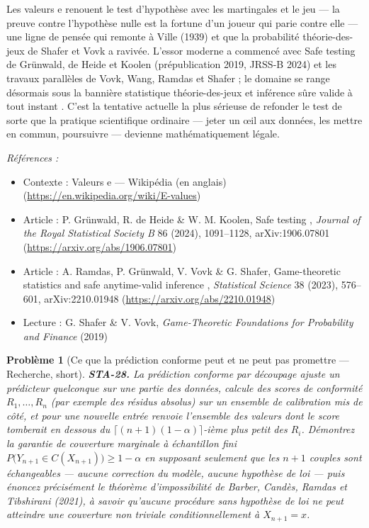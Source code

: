 \documentclass[11pt]{article}
\newtheorem{problem}{Problème}
\newenvironment{refs}{\par\small\noindent\emph{Références :}\begin{itemize}\setlength\itemsep{0pt}}{\end{itemize}\normalsize}
\begin{document}
\noindent Les valeurs e renouent le test d'hypothèse avec les martingales et le jeu --- la
preuve contre l'hypothèse nulle est la fortune d'un joueur qui parie contre elle --- une ligne de
pensée qui remonte à Ville (1939) et que la probabilité théorie-des-jeux de Shafer et Vovk a
ravivée. L'essor moderne a commencé avec \og{} Safe testing \fg{} de Grünwald, de Heide et Koolen
(prépublication 2019, JRSS-B 2024) et les travaux parallèles de Vovk, Wang, Ramdas et Shafer ; le
domaine se range désormais sous la bannière \og{} statistique théorie-des-jeux et inférence sûre valide
à tout instant \fg{}. C'est la tentative actuelle la plus sérieuse de refonder le test de sorte que la
pratique scientifique ordinaire --- jeter un \oe{}il aux données, les mettre en commun, poursuivre ---
devienne mathématiquement légale.

\begin{refs}
\item Contexte : Valeurs e --- Wikipédia (en anglais) (\url{https://en.wikipedia.org/wiki/E-values})
\item Article : P. Grünwald, R. de Heide \& W. M. Koolen, \og{} Safe testing \fg{}, \textit{Journal of the Royal Statistical Society B} 86 (2024), 1091--1128, arXiv:1906.07801 (\url{https://arxiv.org/abs/1906.07801})
\item Article : A. Ramdas, P. Grünwald, V. Vovk \& G. Shafer, \og{} Game-theoretic statistics and safe anytime-valid inference \fg{}, \textit{Statistical Science} 38 (2023), 576--601, arXiv:2210.01948 (\url{https://arxiv.org/abs/2210.01948})
\item Lecture : G. Shafer \& V. Vovk, \textit{Game-Theoretic Foundations for Probability and Finance} (2019)
\end{refs}

\bigskip

\begin{problem}[{Ce que la prédiction conforme peut et ne peut pas promettre --- Recherche, short}]
\textbf{STA-28.} La prédiction conforme par découpage ajuste un prédicteur
quelconque sur une partie des données, calcule des scores de conformité $ R_1, \dots, R_n $ (par
exemple des résidus absolus) sur un ensemble de calibration mis de côté, et pour une nouvelle
entrée renvoie l'ensemble des valeurs dont le score tomberait en dessous du
$ \lceil (n+1)(1-\alpha) \rceil $-ième plus petit des $ R_i $. Démontrez la garantie de
couverture marginale à échantillon fini
$ P\big( Y_{n+1} \in C(X_{n+1}) \big) \ge 1 - \alpha $ en supposant seulement que les $ n+1 $
couples sont échangeables --- aucune correction du modèle, aucune hypothèse de loi --- puis énoncez
précisément le théorème d'impossibilité de Barber, Candès, Ramdas et Tibshirani (2021), à savoir
qu'aucune procédure sans hypothèse de loi ne peut atteindre une couverture non triviale
conditionnellement à $ X_{n+1} = x $.
\end{problem}
\end{document}
